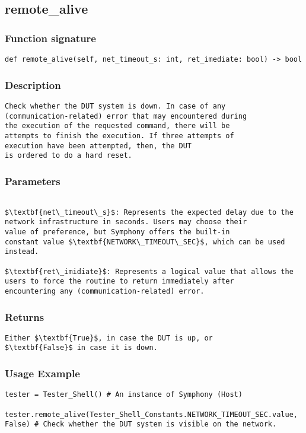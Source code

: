 \subsection{remote\_alive}

\subsubsection{Function signature}
\begin{lstlisting}
def remote_alive(self, net_timeout_s: int, ret_imediate: bool) -> bool
\end{lstlisting}

\subsubsection{Description}
\begin{lstlisting}[mathescape=true, keywordstyle=\color{black}, showstringspaces=false]
Check whether the DUT system is down. In case of any 
(communication-related) error that may encountered during 
the execution of the requested command, there will be 
attempts to finish the execution. If three attempts of 
execution have been attempted, then, the DUT
is ordered to do a hard reset.
\end{lstlisting}
\subsubsection{Parameters}
\begin{lstlisting}[mathescape=true, keywordstyle=\color{black}]

$\textbf{net\_timeout\_s}$: Represents the expected delay due to the 
network infrastructure in seconds. Users may choose their 
value of preference, but Symphony offers the built-in 
constant value $\textbf{NETWORK\_TIMEOUT\_SEC}$, which can be used 
instead.  

$\textbf{ret\_imidiate}$: Represents a logical value that allows the 
users to force the routine to return immediately after 
encountering any (communication-related) error.

\end{lstlisting}

\subsubsection{Returns}
\begin{lstlisting}[mathescape=true, keywordstyle=\color{black}]
Either $\textbf{True}$, in case the DUT is up, or 
$\textbf{False}$ in case it is down.
\end{lstlisting}


\subsubsection{Usage Example}
\begin{lstlisting}
tester = Tester_Shell() # An instance of Symphony (Host)

tester.remote_alive(Tester_Shell_Constants.NETWORK_TIMEOUT_SEC.value, False) # Check whether the DUT system is visible on the network.
\end{lstlisting}
